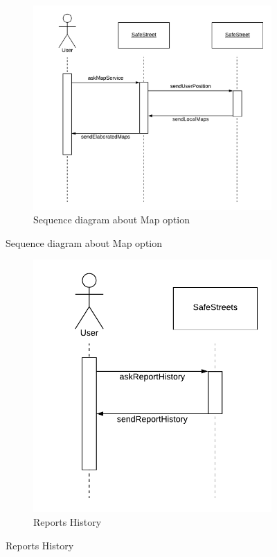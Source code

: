 \documentclass[12pt,a4paper]{report}
\begin{document}
				\begin{figure}[H]
					\begin{subfigure}{\textwidth}
						\includegraphics[scale = 0.70, center]{MapSequenceDiagram}
						\caption{Sequence diagram about Map option}
					\end{subfigure}
				\end{figure}
				\begin{figure}[H]
					\begin{subfigure}{\textwidth}
						\includegraphics[scale = 0.70, center]{HhistorySequenceDiagram}
						\caption{Reports History}
					\end{subfigure}
				\end{figure}
			
\end{document}
